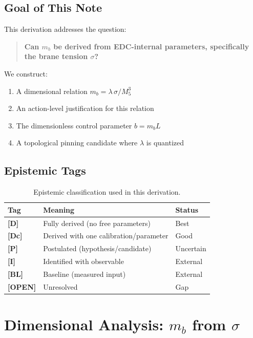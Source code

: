 \documentclass[11pt,a4paper]{article}
\newcommand{\Mfive}{M_5}
\newcommand{\mb}{m_b}
\newcommand{\tagD}{\textbf{[D]}}
\newcommand{\tagDc}{\textbf{[Dc]}}
\newcommand{\tagI}{\textbf{[I]}}
\newcommand{\tagBL}{\textbf{[BL]}}
\newcommand{\tagP}{\textbf{[P]}}
\newcommand{\tagOPEN}{\textbf{[OPEN]}}
\theoremstyle{definition}
\theoremstyle{plain}
\theoremstyle{remark}
\begin{document}
\subsection{Goal of This Note}

This derivation addresses the question:
\begin{quote}
\textbf{Can $\mb$ be derived from EDC-internal parameters, specifically the brane tension $\sigma$?}
\end{quote}

We construct:
\begin{enumerate}
\item A dimensional relation $\mb = \lambda\,\sigma/\Mfive^3$
\item An action-level justification for this relation
\item The dimensionless control parameter $b = \mb L$
\item A topological pinning candidate where $\lambda$ is quantized
\end{enumerate}

\subsection{Epistemic Tags}

\begin{table}[htbp]
\centering
\caption{Epistemic classification used in this derivation.}
\label{tab:tags}
\begin{tabular}{@{}lll@{}}
\toprule
Tag & Meaning & Status \\
\midrule
\tagD{} & Fully derived (no free parameters) & Best \\
\tagDc{} & Derived with one calibration/parameter & Good \\
\tagP{} & Postulated (hypothesis/candidate) & Uncertain \\
\tagI{} & Identified with observable & External \\
\tagBL{} & Baseline (measured input) & External \\
\tagOPEN{} & Unresolved & Gap \\
\bottomrule
\end{tabular}
\end{table}

\section{Dimensional Analysis: $\mb$ from $\sigma$}
\label{sec:dimensional}
\end{document}
